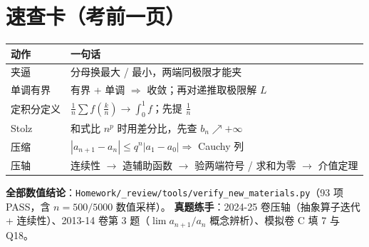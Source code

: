 \documentclass[11pt,a4paper]{ctexart}
\newcommand{\abs}[1]{\left\lvert #1\right\rvert}
\begin{document}
\section{速查卡（考前一页）}

\begin{center}
\begin{tabularx}{15.2cm}{@{}l X@{}}
\toprule
动作 & 一句话 \\
\midrule
夹逼 & 分母换最大 / 最小，两端同极限才能夹 \\
单调有界 & 有界 + 单调 $\Rightarrow$ 收敛；再对递推取极限解 $L$ \\
定积分定义 & $\frac1n\sum f(\frac kn)\to\int_0^1 f$；先提 $\frac1n$ \\
Stolz & 和式比 $n^p$ 时用差分比，先查 $b_n\nearrow+\infty$ \\
压缩 & $\abs{a_{n+1}-a_n}\le q^n\abs{a_1-a_0}\Rightarrow$ Cauchy 列 \\
压轴 & 连续性 $\to$ 造辅助函数 $\to$ 验两端符号 / 求和为零 $\to$ 介值定理 \\
\bottomrule
\end{tabularx}
\end{center}

\vspace{4pt}
\noindent\textbf{全部数值结论}：\texttt{Homework/\_review/tools/verify\_new\_materials.py}（93 项 PASS，含 $n=500/5000$ 数值采样）。
\textbf{真题练手}：2024-25 卷压轴（抽象算子迭代 + 连续性）、2013-14 卷第 3 题（$\lim a_{n+1}/a_n$ 概念辨析）、模拟卷 C 填 7 与 Q18。
\end{document}
